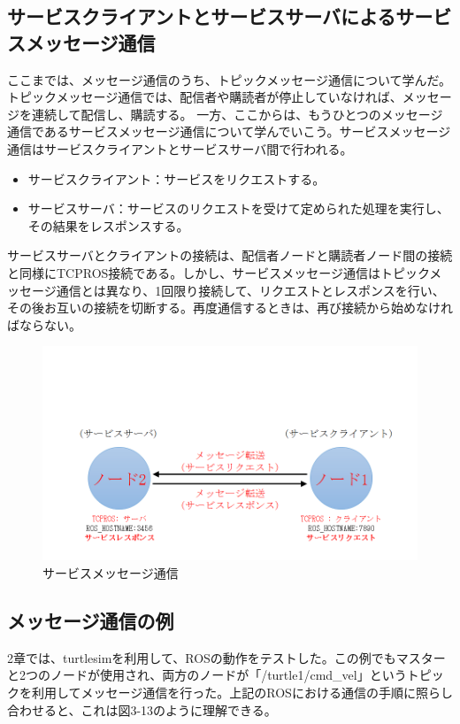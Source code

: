 \subsection{サービスクライアントとサービスサーバによるサービスメッセージ通信}
ここまでは、メッセージ通信のうち、トピックメッセージ通信について学んだ。トピックメッセージ通信では、配信者や購読者が停止していなければ、メッセージを連続して配信し、購読する。
一方、ここからは、もうひとつのメッセージ通信であるサービスメッセージ通信について学んでいこう。サービスメッセージ通信はサービスクライアントとサービスサーバ間で行われる。

\begin{itemize}
\item サービスクライアント：サービスをリクエストする。
\item サービスサーバ：サービスのリクエストを受けて定められた処理を実行し、その結果をレスポンスする。
\end{itemize}
サービスサーバとクライアントの接続は、配信者ノードと購読者ノード間の接続と同様にTCPROS接続である。しかし、サービスメッセージ通信はトピックメッセージ通信とは異なり、1回限り接続して、リクエストとレスポンスを行い、その後お互いの接続を切断する。再度通信するときは、再び接続から始めなければならない。

\begin{figure}[h]
  \centering
  \includegraphics[width=12cm]{pictures/chapter3/pic_03_12.png}
  \caption{サービスメッセージ通信}
\end{figure}

\subsection{メッセージ通信の例}
2章では、turtlesimを利用して、ROSの動作をテストした。この例でもマスターと2つのノードが使用され、両方のノードが「/turtle1/cmd\_vel」というトピックを利用してメッセージ通信を行った。上記のROSにおける通信の手順に照らし合わせると、これは図3-13のように理解できる。

